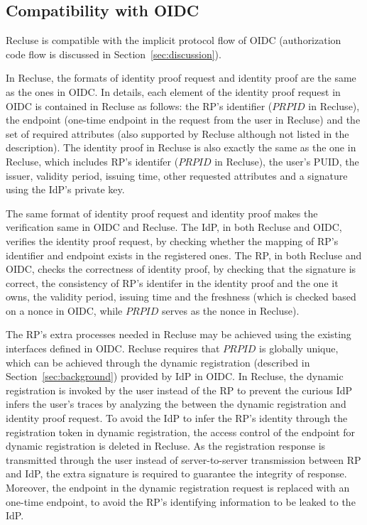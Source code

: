\subsection{Compatibility with OIDC}
\label{subsec:compatible}
Recluse is compatible with the implicit protocol flow of OIDC (authorization code flow is discussed in Section~\ref{sec:discussion}).

In Recluse, the formats of identity proof request and identity proof are the same as the ones in OIDC. In details, each element of the identity proof request in OIDC is contained in Recluse as follows: the RP's identifier ($PRPID$ in Recluse), the endpoint (one-time endpoint in the request from the user in Recluse) and the set of required attributes (also supported by Recluse although not listed in the description). The identity proof in Recluse is also exactly the same as the one in Recluse, which includes RP's identifer ($PRPID$ in Recluse), the user's PUID, the issuer, validity period, issuing time, other requested attributes and a signature using the IdP's private key.

The same format of identity proof request and identity proof makes the verification same in OIDC and Recluse. The IdP, in both Recluse and OIDC, verifies the identity proof request, by checking whether the mapping of RP's identifier and endpoint exists in the registered ones. The RP, in both Recluse and OIDC, checks the correctness of identity proof, by checking that the signature is correct, the consistency of RP's identifer in the identity proof and the one it owns, the validity period, issuing time and the freshness (which is checked based on a nonce in  OIDC, while  $PRPID$ serves as the nonce in Recluse).

The RP's extra processes needed in Recluse may be achieved using the existing interfaces defined in OIDC.  Recluse requires that $PRPID$ is globally unique, which can be achieved through the dynamic registration (described in Section~\ref{sec:background}) provided by IdP in OIDC. In Recluse, the dynamic registration is invoked by the user instead of the RP to prevent the curious IdP infers the user's traces by analyzing the between the dynamic registration and identity proof request. To avoid the IdP to infer the RP's identity through the registration token in dynamic registration, the access control of the endpoint for dynamic registration is deleted in Recluse. As the registration response is transmitted through the user instead of server-to-server transmission between RP and IdP, the extra signature is required to guarantee the integrity of response. Moreover, the endpoint in the dynamic registration request is replaced with an one-time endpoint, to avoid the RP's identifying information to be leaked to the IdP.


